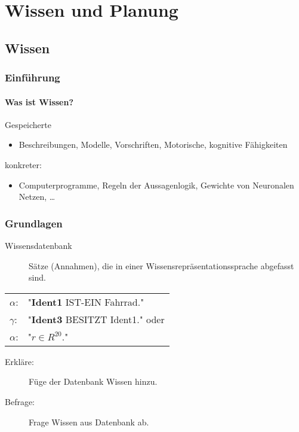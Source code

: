 
\chapter{Wissen und Planung}
\section{Wissen}
\subsection{Einführung}

\subsubsection*{Was ist Wissen?}
Gespeicherte
\begin{itemize}
\item Beschreibungen, Modelle, Vorschriften, Motorische, kognitive Fähigkeiten
\end{itemize}
konkreter:
\begin{itemize}
\item Computerprogramme, Regeln der Aussagenlogik, Gewichte von Neuronalen Netzen, \dots
\end{itemize}

\subsection{Grundlagen}


\begin{description}
	\item[Wissensdatenbank] Sätze (Annahmen), die in einer Wissensrepräsentationssprache abgefasst sind.
\end{description}

\begin{center}
\begin{tabular}{ll}
$\alpha$: & "{}\textbf{Ident1} IST-EIN Fahrrad."{} \\  $\gamma$: & "{}\textbf{Ident3} BESITZT Ident1."{} oder \\ $\alpha$: & "{}$r \in R^{20}$."{}
\end{tabular}
\end{center}


\begin{description}
\item[Erkläre:] Füge der Datenbank Wissen hinzu.
\item[Befrage:] Frage Wissen aus Datenbank ab.
\end{description}


